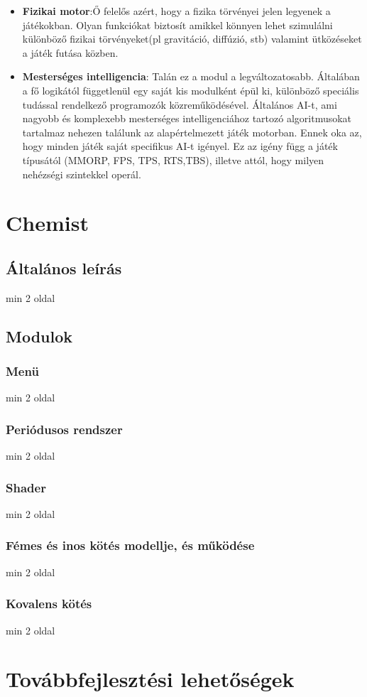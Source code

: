 \documentclass[colorlinks]{thesis-ekf}
\theoremstyle{definition}
\theoremstyle{remark}
\begin{document}
\begin{itemize}
	\item \textbf{Fizikai motor}:Ő felelős azért, hogy a fizika törvényei jelen legyenek a játékokban. Olyan funkciókat biztosít amikkel könnyen lehet szimulálni különböző fizikai törvényeket(pl gravitáció, diffúzió, stb) valamint ütközéseket a játék futása közben.\cite{wiki_game_engine}
	\item \textbf{Mesterséges intelligencia}: Talán ez a modul a legváltozatosabb. Általában a fő logikától függetlenül egy saját kis modulként épül ki, különböző speciális tudással rendelkező programozók közreműködésével. Általános AI-t, ami nagyobb és komplexebb mesterséges intelligenciához tartozó algoritmusokat tartalmaz nehezen találunk az alapértelmezett játék motorban. Ennek oka az, hogy minden játék saját specifikus AI-t igényel. Ez az igény függ a játék típusától (MMORP, FPS, TPS, RTS,TBS), illetve attól, hogy milyen nehézségi szintekkel operál. 
\end{itemize}
\chapter{Chemist}
\section{Általános leírás}
min 2 oldal
\section{Modulok}
\subsection{Menü}
min 2 oldal
\subsection{Periódusos rendszer}
min 2 oldal
\subsection{Shader}
min 2 oldal
\subsection{Fémes és inos kötés modellje, és működése}
min 2 oldal
\subsection{Kovalens kötés}
min 2 oldal
\chapter{Továbbfejlesztési lehetőségek}
\end{document}
